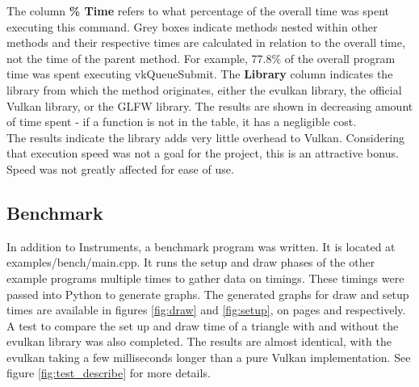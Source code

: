 \documentclass[12pt]{report}
\theoremstyle{definition}
\begin{document}
        The column \textbf{\% Time} refers to what percentage of the overall time was
        spent executing this command. Grey boxes indicate methods nested
        within other methods and their respective times are calculated in
        relation to the overall time, not the time of the parent method.
        For example, 77.8\% of the overall program time was spent executing
        vkQueueSubmit. The \textbf{Library} column indicates the library from which
        the method originates, either the evulkan library, the official Vulkan
        library, or the GLFW library. The results are shown in decreasing
        amount of time spent - if a function is not in the table, it has a
        negligible cost. \\

        The results indicate the library adds very little overhead to Vulkan.
        Considering that execution speed was not a goal for the project,
        this is an attractive bonus. Speed was not greatly affected for
        ease of use.

      \subsection{Benchmark}

        In addition to Instruments, a benchmark program was written. It is
        located at examples/bench/main.cpp. It runs the setup and draw
        phases of the other example programs multiple times to gather
        data on timings. These timings were passed into Python to
        generate graphs. The generated graphs for draw and setup times are available in figures \ref{fig:draw}
        and \ref{fig:setup}, on pages \pageref{fig:draw} and \pageref{fig:setup} respectively. \\

        A test to compare the set up and draw time of a triangle with and
        without the evulkan library was also completed. The results are
        almost identical, with the evulkan taking a few milliseconds
        longer than a pure Vulkan implementation. See figure \ref{fig:test_describe} 
        for more details. \\
\end{document}
